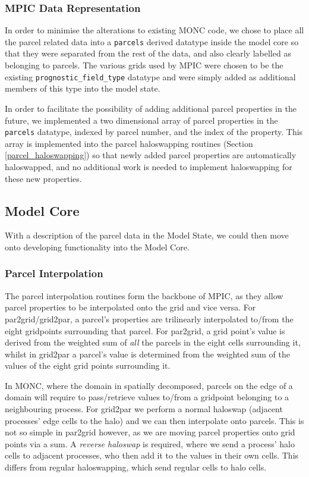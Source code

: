 \documentclass{article}
\begin{document}
\subsubsection{MPIC Data Representation}
In order to minimise the alterations to existing MONC code, we chose to place all the parcel related data into a \verb|parcels| derived datatype inside the model core so that they were separated from the rest of the data, and also clearly labelled as belonging to parcels. The various grids used by MPIC were chosen to be the existing \verb|prognostic_field_type| datatype and were simply added as additional members of this type into the model state.

In order to facilitate the possibility of adding additional parcel properties in the future, we implemented a two dimensional array of parcel properties in the \verb|parcels| datatype, indexed by parcel number, and the index of the property. This array is implemented into the parcel haloswapping routines (Section \ref{parcel_haloswapping}) so that newly added parcel properties are automatically haloswapped, and no additional work is needed to implement haloswapping for these new properties.

\subsection{Model Core}
With a description of the parcel data in the Model State, we could then move onto developing functionality into the Model Core.

\subsubsection{Parcel Interpolation}
The parcel interpolation routines form the backbone of MPIC, as they allow parcel properties to be interpolated onto the grid and vice versa. For par2grid/grid2par, a parcel's properties are trilinearly interpolated to/from the eight gridpoints surrounding that parcel. For par2grid, a grid point's value is derived from the weighted sum of \emph{all} the parcels in the eight cells surrounding it, whilst in grid2par a parcel's value is determined from the weighted sum of the values of the eight grid points surrounding it.

In MONC, where the domain in spatially decomposed, parcels on the edge of a domain will require to pass/retrieve values to/from a gridpoint belonging to a neighbouring process. For grid2par we perform a normal haloswap (adjacent processes' edge cells to the halo) and we can then interpolate onto parcels. This is not so simple in par2grid however, as we are moving parcel properties onto grid points via a sum. A \emph{reverse haloswap} is required, where we send a process' halo cells to adjacent processes, who then add it to the values in their own cells. This differs from regular haloswapping, which send regular cells to halo cells.
\end{document}
